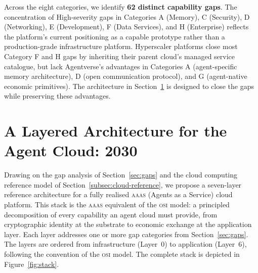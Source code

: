 \documentclass[twoside,11pt]{article}
\begin{document}
Across the eight categories, we identify \textbf{62 distinct capability gaps}.
The concentration of High-severity gaps in Categories A (Memory), C (Security),
D (Networking), E (Development), F (Data Services), and H (Enterprise) reflects
the platform's current positioning as a capable prototype rather than a
production-grade infrastructure platform.  Hyperscaler platforms close most
Category F and H gaps by inheriting their parent cloud's managed service
catalogue, but lack Agentverse's advantages in Categories A (agent-specific
memory architecture), D (open communication protocol), and G (agent-native
economic primitives).  The architecture in Section~\ref{sec:architecture} is
designed to close the gaps while preserving these advantages.

\section{A Layered Architecture for the Agent Cloud: 2030}
\label{sec:architecture}

Drawing on the gap analysis of Section~\ref{sec:gaps} and the cloud computing
reference model of Section~\ref{subsec:cloud-reference}, we propose a
seven-layer reference architecture for a fully realised \textsc{aaas} (Agents
as a Service) cloud platform.  This stack is the \textsc{aaas} equivalent of
the \textsc{osi} model: a principled decomposition of every capability an
agent cloud must provide, from cryptographic identity at the substrate to
economic exchange at the application layer.  Each layer addresses one or more
gap categories from Section~\ref{sec:gaps}.  The layers are ordered from
infrastructure (Layer~0) to application (Layer~6), following the convention
of the \textsc{osi} model.  The complete stack is depicted in
Figure~\ref{fig:stack}.
\end{document}
